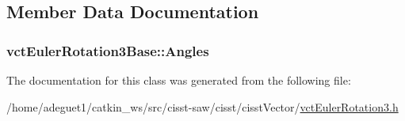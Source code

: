 \subsection{Member Data Documentation}
\hypertarget{classvct_euler_rotation3_base_a203faf33e57587d98e65a216d186288c}{
\subsubsection[{Angles}]{ vct\-Euler\-Rotation3\-Base\-::\-Angles\hspace{0.3cm}{\ttfamily [protected]}}}\label{classvct_euler_rotation3_base_a203faf33e57587d98e65a216d186288c}


The documentation for this class was generated from the following file\-:\begin{DoxyCompactItemize}
\item 
/home/adeguet1/catkin\-\_\-ws/src/cisst-\/saw/cisst/cisst\-Vector/\hyperlink{vct_euler_rotation3_8h}{vct\-Euler\-Rotation3.\-h}\end{DoxyCompactItemize}
